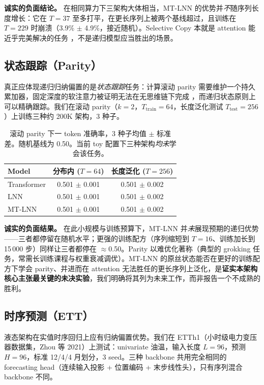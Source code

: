 \documentclass[11pt]{article}
\theoremstyle{definition}
\begin{document}
\textbf{诚实的负面结论。} 在相同算力下三架构大体相当，MT-LNN 的优势并\emph{不}随序列长度增长：它在 $T=37$ 至多打平，在更长序列上被两个基线超过，且训练在 $T=229$ 时崩溃（3.9\% $\pm$ 4.9\%，接近随机）。Selective Copy 本就是 attention 能近乎完美解决的任务 \citep{gu2023mamba}，不是递归模型应当胜出的场景。

\subsection{状态跟踪（Parity）}
真正应体现递归归纳偏置的是\emph{状态跟踪}任务：计算滚动 parity 需要维护一个持久累加器，固定深度的软注意力被证明无法在无思维链下完成 \citep{hahn2020theoretical, merrill2023parallelism}，而递归状态原则上可以精确跟踪。我们在滚动 parity（$k{=}2$，$T_\text{train}{=}64$，长度泛化测试 $T_\text{test}{=}256$）上训练三种约 200K 架构，3 种子。

\begin{table}[h]
\centering
\caption{滚动 parity 下一 token 准确率，3 种子均值 $\pm$ 标准差。随机基线为 0.50。当前 toy 配置下三种架构\emph{均未}学会该任务。}
\label{tab:state_tracking}
\begin{tabular}{lcc}
\toprule
Model & 分布内 ($T{=}64$) & 长度泛化 ($T{=}256$) \\
\midrule
Transformer & 0.501 $\pm$ 0.001 & 0.501 $\pm$ 0.002 \\
LNN & 0.501 $\pm$ 0.001 & 0.501 $\pm$ 0.002 \\
MT-LNN & 0.501 $\pm$ 0.001 & 0.501 $\pm$ 0.002 \\
\bottomrule
\end{tabular}
\end{table}

\textbf{诚实的负面结果。} 在此小规模与训练预算下，MT-LNN 并\emph{未}展现预期的递归优势——三者都停留在随机水平；更强的训练配方（序列缩短到 $T=16$、训练加长到 15\,000 步）同样让三者都停在 $\approx$0.50。Parity 以难优化著称（典型的 grokking 任务，常需长训练课程与权重衰减调优）。MT-LNN 的原丝状态能否在更好的训练配方下学会 parity、并进而在 attention 无法胜任的更长序列上泛化，是\textbf{证实本架构核心主张最关键的未决实验}，我们明确将其列为未来工作，而非报告一个不成熟的胜利。

\subsection{时序预测（ETT）}
\label{sec:ett}
液态架构在实值时序回归上应有归纳偏置优势。我们在 ETTh1（小时级电力变压器数据集，Zhou 等 2021）上测试：univariate 油温，输入长度 $L=96$，预测 $H=96$，标准 12/4/4 月划分，3 seed。三种 backbone 共用完全相同的 forecasting head（连续输入投影 + 位置编码 + 末步线性头），只有序列混合 backbone 不同。
\end{document}
